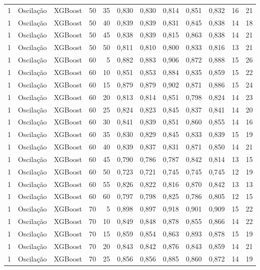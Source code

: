 \begin{longtable}{ccclrrrrrrrr}
1 & Oscilação & XGBoost & 50 & 35 & 0,830 & 0,830 & 0,814 & 0,851 & 0,832 & 16 & 21 \\
1 & Oscilação & XGBoost & 50 & 40 & 0,839 & 0,839 & 0,831 & 0,845 & 0,838 & 14 & 18 \\
1 & Oscilação & XGBoost & 50 & 45 & 0,838 & 0,839 & 0,815 & 0,863 & 0,838 & 14 & 21 \\
1 & Oscilação & XGBoost & 50 & 50 & 0,811 & 0,810 & 0,800 & 0,833 & 0,816 & 13 & 21 \\
1 & Oscilação & XGBoost & 60 & 5 & 0,882 & 0,883 & 0,906 & 0,872 & 0,888 & 15 & 26 \\
1 & Oscilação & XGBoost & 60 & 10 & 0,851 & 0,853 & 0,884 & 0,835 & 0,859 & 15 & 22 \\
1 & Oscilação & XGBoost & 60 & 15 & 0,879 & 0,879 & 0,902 & 0,871 & 0,886 & 15 & 24 \\
1 & Oscilação & XGBoost & 60 & 20 & 0,813 & 0,814 & 0,851 & 0,798 & 0,824 & 14 & 23 \\
1 & Oscilação & XGBoost & 60 & 25 & 0,824 & 0,823 & 0,845 & 0,837 & 0,841 & 14 & 20 \\
1 & Oscilação & XGBoost & 60 & 30 & 0,841 & 0,839 & 0,851 & 0,860 & 0,855 & 14 & 16 \\
1 & Oscilação & XGBoost & 60 & 35 & 0,830 & 0,829 & 0,845 & 0,833 & 0,839 & 15 & 19 \\
1 & Oscilação & XGBoost & 60 & 40 & 0,839 & 0,837 & 0,831 & 0,871 & 0,850 & 14 & 21 \\
1 & Oscilação & XGBoost & 60 & 45 & 0,790 & 0,786 & 0,787 & 0,842 & 0,814 & 13 & 15 \\
1 & Oscilação & XGBoost & 60 & 50 & 0,723 & 0,721 & 0,745 & 0,745 & 0,745 & 12 & 19 \\
1 & Oscilação & XGBoost & 60 & 55 & 0,826 & 0,822 & 0,816 & 0,870 & 0,842 & 13 & 13 \\
1 & Oscilação & XGBoost & 60 & 60 & 0,797 & 0,798 & 0,825 & 0,786 & 0,805 & 12 & 15 \\
1 & Oscilação & XGBoost & 70 & 5 & 0,898 & 0,897 & 0,918 & 0,901 & 0,909 & 15 & 22 \\
1 & Oscilação & XGBoost & 70 & 10 & 0,849 & 0,848 & 0,878 & 0,855 & 0,866 & 14 & 22 \\
1 & Oscilação & XGBoost & 70 & 15 & 0,859 & 0,854 & 0,863 & 0,893 & 0,878 & 15 & 19 \\
1 & Oscilação & XGBoost & 70 & 20 & 0,843 & 0,842 & 0,876 & 0,843 & 0,859 & 14 & 21 \\
1 & Oscilação & XGBoost & 70 & 25 & 0,856 & 0,856 & 0,885 & 0,860 & 0,872 & 14 & 19 \\

\end{longtable}
